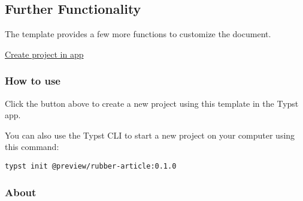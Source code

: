 \subsection{Further Functionality}\label{further-functionality}

The template provides a few more functions to customize the document.

\begin{Shaded}
\begin{Highlighting}[]
\NormalTok{)}
\end{Highlighting}
\end{Shaded}

\href{/app?template=rubber-article&version=0.1.0}{Create project in app}

\subsubsection{How to use}\label{how-to-use}

Click the button above to create a new project using this template in
the Typst app.

You can also use the Typst CLI to start a new project on your computer
using this command:

\begin{verbatim}
typst init @preview/rubber-article:0.1.0
\end{verbatim}



\subsubsection{About}\label{about}

